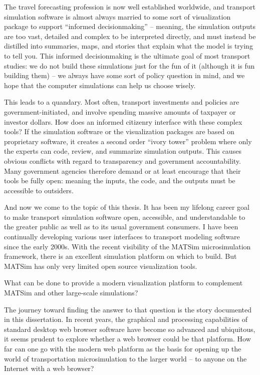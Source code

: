 The travel forecasting profession is now well established worldwide, and transport simulation software is almost always married to some sort of visualization package to support ``informed decisionmaking'' -- meaning, the simulation outputs are too vast, detailed and complex to be interpreted directly, and must instead be distilled into summaries, maps, and stories that explain what the model is trying to tell you. This informed decisionmaking is the ultimate goal of most transport studies: we do not build these simulations just for the fun of it (although it is fun building them) -- we always have some sort of policy question in mind, and we hope that the computer simulations can help us choose wisely.

This leads to a quandary. Most often, transport investments and policies are government-initiated, and involve spending massive amounts of taxpayer or investor dollars. How does an informed citizenry interface with these complex tools? If the simulation software or the visualization packages are based on proprietary software, it creates a second order ``ivory tower'' problem where only the experts can code, review, and summarize simulation outputs. This causes obvious conflicts with regard to transparency and government accountability. Many government agencies therefore demand or at least encourage that their tools be fully open: meaning the inputs, the code, and the outputs must be accessible to outsiders.

And now we come to the topic of this thesis. It has been my lifelong career goal to make transport simulation software open, accessible, and understandable to the greater public as well as to its usual government consumers. I have been continually developing various user interfaces to transport modeling software since the early 2000s. With the recent visibility of the \gls{MATSim} microsimulation framework, there is an excellent simulation platform on which to build. But MATSim has only very limited open source visualization tools.

What can be done to provide a modern visualization platform to complement MATSim and other large-scale simulations?

The journey toward finding the answer to that question is the story documented in this dissertation. In recent years, the graphical and processing capabilities of standard desktop web browser software have become so advanced and ubiquitous, it seems prudent to explore whether a web browser could be that platform. How far can one go with the modern web platform as the basis for opening up the world of transportation microsimulation to the larger world -- to anyone on the Internet with a web browser?

